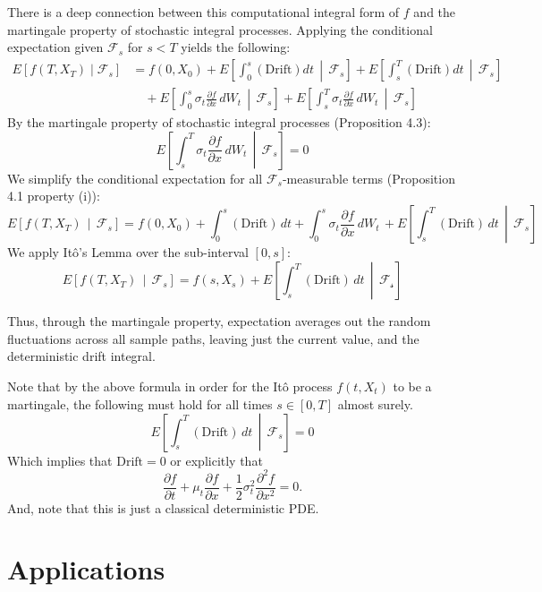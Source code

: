 \documentclass[12pt]{article}
\theoremstyle{definition}
\theoremstyle{plain}
\theoremstyle{remark}
\begin{document}
There is a deep connection between this computational integral form of $f$ and the martingale property of stochastic integral processes.  Applying the conditional expectation given $\mathcal{F}_s$ for $s<T$ yields the following:
\begin{align*}
E[f(T,X_T) \mid \mathcal{F}_{s}] 
    &= f(0,X_0) + E\left[\int_0^s\left(\text{Drift}\right)dt \,\middle|\, \mathcal{F}_{s}\right] + E\left[\int_s^T\left(\text{Drift}\right)dt \,\middle|\, \mathcal{F}_{s}\right] \\
    &\quad + E\left[\int_0^s \sigma_t \frac{\partial f}{\partial x} \, dW_t \,\middle|\, \mathcal{F}_{s}\right] 
    + E\left[\int_s^T \sigma_t \frac{\partial f}{\partial x} \, dW_t \,\middle|\, \mathcal{F}_{s}\right]
\end{align*}
By the martingale property of stochastic integral processes (Proposition 4.3):
\[
E \left[ \int_s^T \sigma_t \frac{\partial f}{\partial x} \, dW_t \, \middle| \, \mathcal{F}_{s} \right] =0
\]
We simplify the conditional expectation for all $\mathcal{F}_s$-measurable terms (Proposition 4.1 property (i)):
\[
E[f(T,X_T) \, \mid \, \mathcal{F}_{s}] = f(0,X_0)+\int_0^s\left( \text{Drift} \right)\,dt+\int_0^s \sigma_t \frac{\partial f}{\partial x} \, dW_t \, +E \left[ \int_s^T\left( \text{Drift} \right)\,dt \, \middle| \, \mathcal{F}_{s}\right] 
\]
We apply It\^o's Lemma over the sub-interval $[0,s]$:
\[
E[f(T,X_T) \, \mid \, \mathcal{F}_{s}] = f(s,X_s) + E \left[ \int_s^T\left( \text{Drift} \right)\,dt \, \middle| \, \mathcal{F_{s}}\right] 
\]

Thus, through the martingale property, expectation averages out the random fluctuations across all sample paths, leaving just the current value, and the deterministic drift integral.

Note that by the above formula in order for the It\^o process $f(t,X_t)$ to be a martingale, the following must hold for all times $s \in [0,T]$ almost surely.
\[
E \left[ \int_s^T\left( \text{Drift} \right)\,dt \, \middle| \, \mathcal{F}_{s} \right] =0
\]
Which implies that $\text{Drift} =0$ or explicitly that
\[
 \frac{\partial f}{\partial t} + \mu_t \frac{\partial f}{\partial x} + \frac{1}{2} \sigma_t^2 \frac{\partial^2 f}{\partial x^2} = 0.
\]
And, note that this is just a classical deterministic PDE.


\section{Applications}
\end{document}
